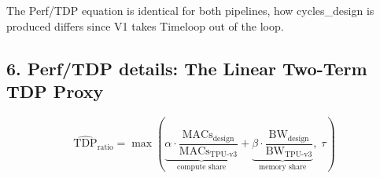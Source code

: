 \documentclass[11pt,a4paper]{article}
\newcommand{\ic}[1]{\texttt{#1}}
\begin{document}

The Perf/TDP equation is identical for both pipelines, how cycles\_design is produced differs since V1 takes Timeloop out of the loop. 







\subsection{6. Perf/TDP details: The Linear Two-Term TDP Proxy}

\begin{equation}
\widehat{\text{TDP}}_{\text{ratio}}
= \max\!\left(
\underbrace{\alpha \cdot \frac{\text{MACs}_{\text{design}}}{\text{MACs}_{\text{TPU-v3}}}}_{\text{compute share}}
+ \underbrace{\beta \cdot \frac{\text{BW}_{\text{design}}}{\text{BW}_{\text{TPU-v3}}}}_{\text{memory share}},
\;\tau\right)
\end{equation}
\end{document}
